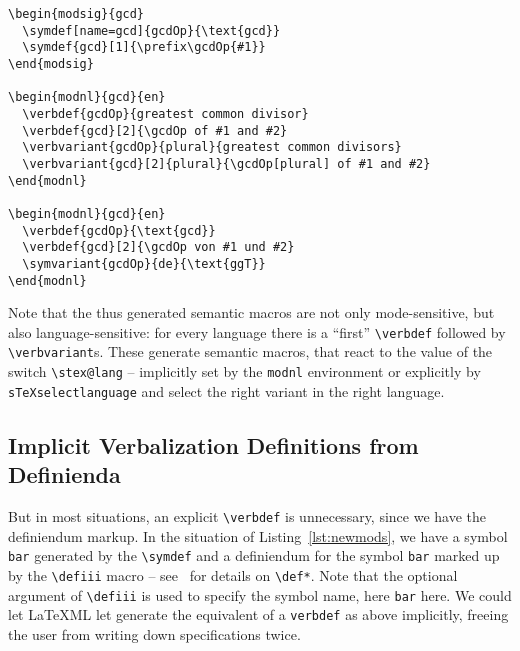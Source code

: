 \documentclass{bluenote}
\def\latexml{{\LaTeX}ML\xspace}
\begin{document}
\begin{lstlisting}[label=lst:gcd,caption=Notation and Verbalization Definitions for
  Greatest Common Divisor]
\begin{modsig}{gcd}
  \symdef[name=gcd]{gcdOp}{\text{gcd}}
  \symdef{gcd}[1]{\prefix\gcdOp{#1}}
\end{modsig}

\begin{modnl}{gcd}{en}
  \verbdef{gcdOp}{greatest common divisor}
  \verbdef{gcd}[2]{\gcdOp of #1 and #2}
  \verbvariant{gcdOp}{plural}{greatest common divisors}
  \verbvariant{gcd}[2]{plural}{\gcdOp[plural] of #1 and #2}
\end{modnl}

\begin{modnl}{gcd}{en}
  \verbdef{gcdOp}{\text{gcd}}
  \verbdef{gcd}[2]{\gcdOp von #1 und #2}
  \symvariant{gcdOp}{de}{\text{ggT}}
\end{modnl}
\end{lstlisting}
Note that the thus generated semantic macros are not only mode-sensitive, but also
language-sensitive: for every language there is a ``first'' \lstinline|\verbdef| followed
by \lstinline|\verbvariant|s. These generate semantic macros, that react to the value of
the switch \lstinline|\stex@lang| -- implicitly set by the \lstinline|modnl| environment
or explicitly by \lstinline|sTeXselectlanguage| and select the right variant in the right
language.

\subsection{Implicit Verbalization Definitions from Definienda}

But in most situations, an explicit \lstinline|\verbdef| is unnecessary, since we have the
definiendum markup. In the situation of Listing~\ref{lst:newmods}, we have a symbol
\lstinline|bar| generated by the \lstinline|\symdef| and a definiendum for the symbol
\lstinline|bar| marked up by the \lstinline|\defiii| macro -- see~\cite{Kohlhase:smms:svn}
for details on \lstinline|\def*|. Note that the optional argument of \lstinline|\defiii|
is used to specify the symbol name, here \lstinline|bar| here. We could let \latexml let
generate the equivalent of a \lstinline|verbdef| as above implicitly, freeing the user
from writing down specifications twice.
\end{document}
